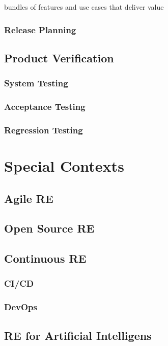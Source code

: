 \documentclass{reqengbook}
\begin{document}
bundles of features and use cases that deliver value

\section{Release Planning} 

\chapter{Product Verification}
\section{System Testing}
\section{Acceptance Testing}
\section{Regression Testing}

\part{Special Contexts}

\chapter{Agile RE}

\chapter{Open Source RE}

\chapter{Continuous RE}

\section{CI/CD}
\section{DevOps}

\chapter{RE for Artificial Intelligens}
\end{document}
